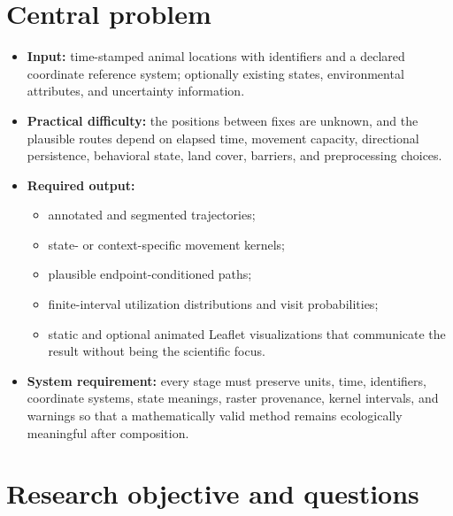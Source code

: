 \section{Central problem}

\begin{itemize}
  \item \textbf{Input:} time-stamped animal locations with identifiers and a declared coordinate reference system; optionally existing states, environmental attributes, and uncertainty information.
  \item \textbf{Practical difficulty:} the positions between fixes are unknown, and the plausible routes depend on elapsed time, movement capacity, directional persistence, behavioral state, land cover, barriers, and preprocessing choices.
  \item \textbf{Required output:}
  \begin{itemize}
    \item annotated and segmented trajectories;
    \item state- or context-specific movement kernels;
    \item plausible endpoint-conditioned paths;
    \item finite-interval utilization distributions and visit probabilities;
    \item static and optional animated Leaflet visualizations that communicate the result without being the scientific focus.
  \end{itemize}
  \item \textbf{System requirement:} every stage must preserve units, time, identifiers, coordinate systems, state meanings, raster provenance, kernel intervals, and warnings so that a mathematically valid method remains ecologically meaningful after composition.
\end{itemize}

\section{Research objective and questions}
\label{sec:research-questions}

